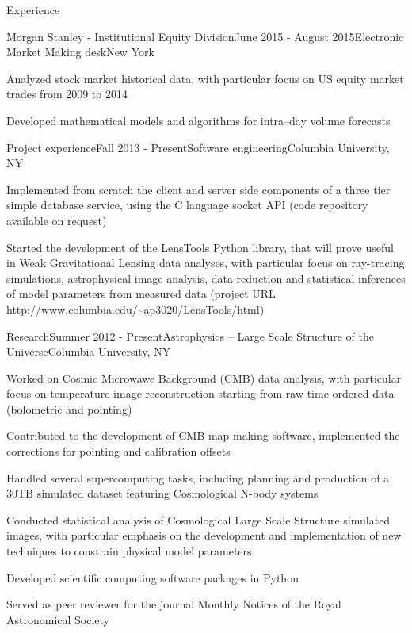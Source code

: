 \documentclass{resume} %
\begin{document}
\begin{rSection}{Experience}

\begin{rSubsection}{Morgan Stanley - Institutional Equity Division}{June 2015 - August 2015}{Electronic Market Making desk}{New York}
\item Analyzed stock market historical data, with particular focus on US equity market trades from 2009 to 2014
\item Developed mathematical models and algorithms for intra--day volume forecasts 
\end{rSubsection}

\begin{rSubsection}{Project experience}{Fall 2013 - Present}{Software engineering}{Columbia University, NY}
\item Implemented from scratch the client and server side components of a three tier simple database service, using the C language socket API (code repository available on request)
\item Started the development of the LensTools Python library, that will prove useful in Weak Gravitational Lensing data analyses, with particular focus on ray-tracing simulations, astrophysical image analysis, data reduction and statistical inferences of model parameters from measured data (project URL \url{http://www.columbia.edu/~ap3020/LensTools/html})
\end{rSubsection}


\begin{rSubsection}{Research}{Summer 2012 - Present}{Astrophysics -- Large Scale Structure of the Universe}{Columbia University, NY}
\item Worked on Cosmic Microwawe Background (CMB) data analysis, with particular focus on temperature image reconstruction starting from raw time ordered data (bolometric and pointing) 
\item Contributed to the development of CMB map-making software, implemented the corrections for pointing and calibration offsets
\item Handled several supercomputing tasks, including planning and production of a 30TB simulated dataset featuring Cosmological N-body systems
\item Conducted statistical analysis of Cosmological Large Scale Structure simulated images, with particular emphasis on the development and implementation of new techniques to constrain physical model parameters
\item Developed scientific computing software packages in Python
\item Served as peer reviewer for the journal Monthly Notices of the Royal Astronomical Society
\end{rSubsection}



\end{rSection}
\end{document}
